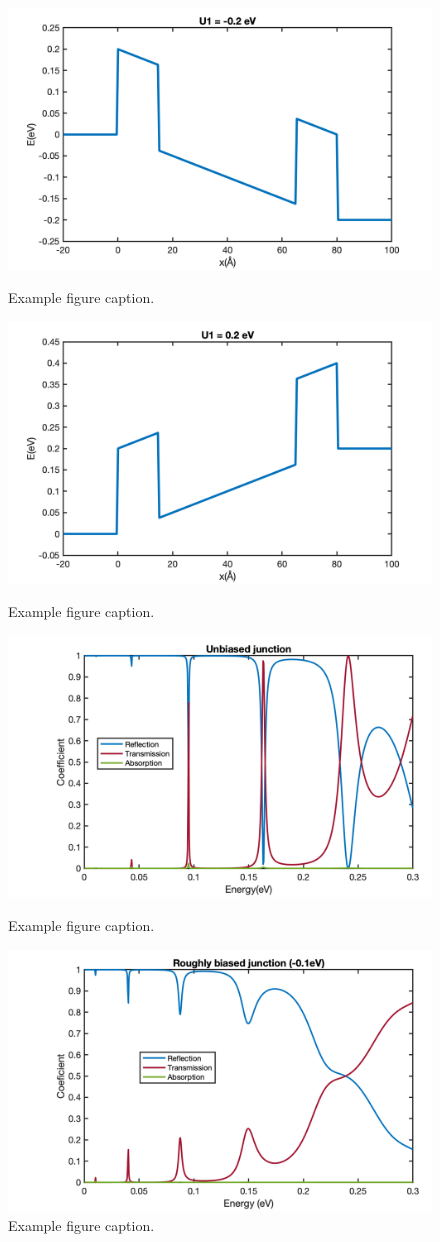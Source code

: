 \documentclass[twocolumn]{article}
\begin{document}
\begin{figure}[h]
    \centering
    \includegraphics[width=0.8\linewidth]{U1_-0.2.png}
    \caption{Example figure caption.}
    \label{fig:example-3}

    \centering
    \includegraphics[width=0.8\linewidth]{U1_0.2.png}
    \caption{Example figure caption.}
    \label{fig:example-4}

    \centering
    \includegraphics[width=0.8\linewidth]{unbiased_junction_spectra.png}
    \caption{Example figure caption.}
    \label{fig:example-5}
    \centering
    \includegraphics[width=0.8\linewidth]{roughly_biased_junction_spectra.png}
    \caption{Example figure caption.}
    \label{fig:example-6}
\end{figure}
\end{document}
